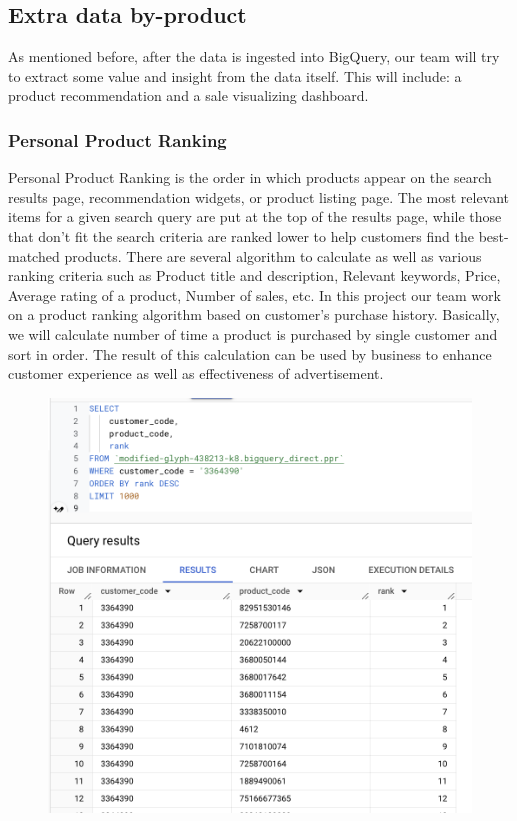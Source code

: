 \subsection{Extra data by-product}

As mentioned before, after the data is ingested into BigQuery, our team will try to extract some
value and insight from the data itself. This will include: a product recommendation and a sale
visualizing dashboard.

\subsubsection{Personal Product Ranking}
Personal Product Ranking is the order in which products appear on the search results page, recommendation widgets, or product listing page. The most relevant items for a given search query are put at the top of the results page, while those that don’t fit the search criteria are ranked lower to help customers find the best-matched products. There are several algorithm to calculate as well as various  ranking criteria such as Product title and description, Relevant keywords, Price, Average rating of a product, Number of sales, etc. In this project our team work on a product ranking  algorithm based on customer’s purchase history. Basically, we will calculate number of time a product is purchased by single customer and sort in order. The result of this calculation can be used by business to enhance customer experience as well as effectiveness of advertisement.
\begin{figure}[!htp]
    \centering
    \includegraphics[width=0.75\linewidth]{images/PPR.png}
    \label{fig:enter-label}
\end{figure}

